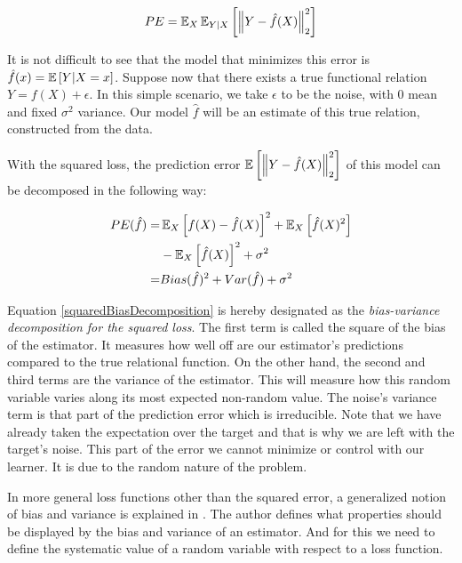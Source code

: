 \begin{equation}\label{squaredPE}
PE = \operatorname{\mathbb{E}}_X \operatorname{\mathbb{E}}_{Y|X} \left[ \left\Vert  Y - \hat{f}(X)  \right\Vert_2^2 \right]
\end{equation}

It is not difficult to see that the model that minimizes this error is $\hat{f}(x) = \operatorname{\mathbb{E}} \left[ Y | X=x \right] $. Suppose now that there exists a true functional relation $Y = f(X) + \epsilon$.
In this simple scenario, we take $\epsilon$ to be the noise, with $0$ mean and fixed $\sigma^2$ variance. Our model $\hat{f}$ will be an estimate of this true relation, constructed from the data.

With the squared loss, the prediction error $\operatorname{\mathbb{E}} \left[ \left\Vert Y  - \hat{f}(X) \right\Vert_2^2 \right]$ of this model can be decomposed in the following way:

\begin{equation}\label{squaredBiasDecomposition}
\begin{split}
PE( \hat{f} ) = & \operatorname{\mathbb{E}}_X \left[   f(X)  - \hat{f}(X) \right]^2 +  \operatorname{\mathbb{E}}_X \left[ \hat{f}(X)^2  \right] \\
& - \operatorname{\mathbb{E}}_X \left[ \hat{f}(X)  \right]^2  + \sigma^2 \\
= & Bias(\hat{f})^2 + Var(\hat{f}) + \sigma^2
\end{split}
\end{equation}

Equation \ref{squaredBiasDecomposition} is hereby designated as the \textit{bias-variance decomposition for the squared loss}. The first term is called the square of the bias of the estimator. It measures how well off are our estimator's predictions compared to the true relational function. On the other hand, the second and third terms are the variance of the estimator. This will measure how this random variable varies along its most expected non-random value. The noise's variance term is that part of the prediction error which is irreducible. Note that we have already taken the expectation over the target and that is why we are left with the target's noise. This part of the error we cannot minimize or control with our learner. It is due to the random nature of the problem.

In more general loss functions other than the squared error, a generalized notion of bias and variance is explained in \textcite{james-biasVarianceGeneral}. The author defines what properties should be displayed by the bias and variance of an estimator. And for this we need to define the systematic value of a random variable with respect to a loss function.

